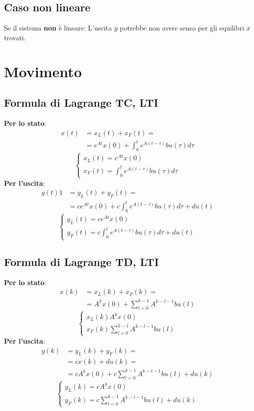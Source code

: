     \subsection{Caso non lineare}
    Se il sistema \textbf{non} è lineare:\newline
    L'uscita $\bar{y}$ potrebbe non avere senso per gli equilibri $\bar{x}$ trovati. 
    \newpage\section{Movimento}
    \subsection{Formula di Lagrange TC, LTI}
    \textbf{Per lo stato}:
    \[
            \begin{split}
            x(t) &= x_L(t) + x_F(t) =\\
            &=e^{At} x(0) + \int_{0}^{t}e^{A(t-\tau)}bu(\tau)d \tau
            \end{split}
    \]
    \[
        \begin{cases}
            x_L(t) = e^{At} x(0)\\
            x_F(t) = \int_{0}^{t}e^{A(t-\tau)}bu(\tau)d \tau
        \end{cases}
    \]
    \textbf{Per l'uscita}:
    \[
            \begin{split}
            y(t) 1 &= y_L(t) + y_F(t) =\\
            &= ce^{At}x(0) + c \int_{0}^{t}e^{A(t-\tau)}bu(\tau)d \tau + du(t)
            \end{split}
    \]
    \[
        \begin{cases}
            y_L(t) = ce^{At}x(0)\\
            y_F(t) = c \int_{0}^{t}e^{A(t-\tau)}bu(\tau)d \tau + du(t)
        \end{cases}
    \]
    \subsection{Formula di Lagrange TD, LTI}
    \textbf{Per lo stato}:
    \[
            \begin{split}
            x(k) &= x_L(k) + x_F(k) =\\
            &=A^k x(0) + \sum_{l=0}^{k-1}A^{k-l-1}bu(l)
            \end{split}
    \]
    \[
        \begin{cases}
            x_L(k) A^k x(0)\\
            x_F(k) \sum_{l=0}^{k-1}A^{k-l-1}bu(l)
        \end{cases}
    \]
    \textbf{Per l'uscita}:
    \[
        \begin{split}
            y(k) &= y_L(k) + y_F(k) =\\
            &= cx(k)+du(k) = \\
            &=cA^k x(0) + c\sum_{l=0}^{k-1}A^{k-l-1}bu(l) + du(k)
        \end{split}
    \]
    \[
        \begin{cases}
            y_L(k) = cA^k x(0)\\
            y_F(k) = c\sum_{l=0}^{k-1}A^{k-l-1}bu(l) + du(k)
        \end{cases}
    \]
